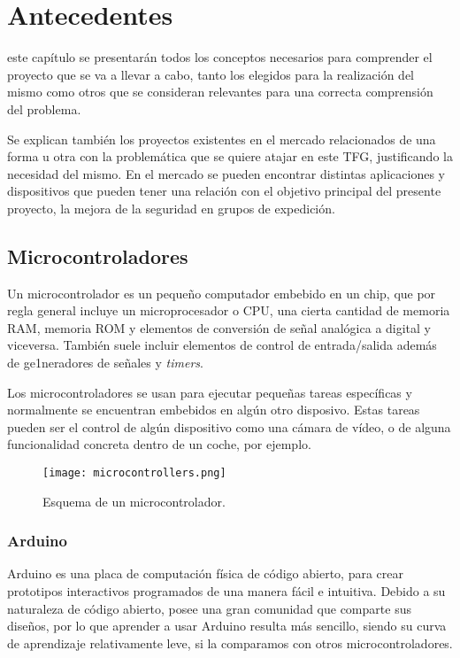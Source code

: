 \chapter{Antecedentes}
\label{chap:antecedentes}

 este capítulo se presentarán todos los conceptos necesarios para comprender el proyecto que se va a llevar a cabo, tanto los elegidos para la realización del mismo como otros que se consideran relevantes para una correcta comprensión del problema.

Se explican también los proyectos existentes en el mercado relacionados de una forma u otra con la problemática que se quiere atajar en este \ac{TFG}, justificando la necesidad del mismo. En el mercado se pueden encontrar distintas aplicaciones y dispositivos que pueden tener una relación con el objetivo principal del presente proyecto, la mejora de la seguridad en grupos de expedición.

\section{Microcontroladores}

Un microcontrolador \cite{16} es un pequeño computador embebido en un chip, que por regla general incluye un microprocesador o \ac{CPU}, una cierta cantidad de memoria \acs{RAM}, memoria \acs{ROM} y elementos de conversión de señal analógica a digital y viceversa. También suele incluir elementos de control de entrada/salida además de ge1neradores de señales y \textit{timers}.

Los microcontroladores se usan para ejecutar pequeñas tareas específicas y normalmente se encuentran embebidos en algún otro disposivo. Estas tareas pueden ser el control de algún dispositivo como una cámara de vídeo, o de alguna funcionalidad concreta dentro de un coche, por ejemplo.

\begin{figure}[!h]
\begin{center}
\texttt{[image: microcontrollers.png]}
\caption{Esquema de un microcontrolador.}
\label{fig:microcontrolador}
\end{center}
\end{figure}

\subsection{Arduino}

Arduino \cite{18} es una placa de computación física de código abierto, para crear prototipos interactivos programados de una manera fácil e intuitiva. Debido a su naturaleza de código abierto, posee una gran comunidad que comparte sus diseños, por lo que aprender a usar Arduino resulta más sencillo, siendo su curva de aprendizaje relativamente leve, si la comparamos con otros microcontroladores.

